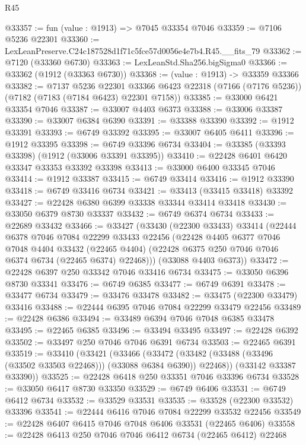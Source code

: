 \begin{lexlean}{R45}
\begin{coremodule}
{@33357 := fun (value : @1913) => @7045 @33354 @7046
@33359 := @7106 @5236 @22301
@33360 := LexLeanPreserve.C24c187528d1f71c5fce57d0056e4e7b4.R45.__fits_79
@33362 := @7120 (@33360 @6730)
@33363 := LexLeanStd.Sha256.bigSigma0
@33366 := @33362 (@1912 (@33363 @6730))
@33368 := (value : @1913) -> @33359 @33366
@33382 := @7137
    @5236
    @22301
    @33366
    @6423
    @22318
    (@7166 (@7176 @5236))
    (@7182 (@7183 (@7184 @6423) @22301 @7158))
@33385 := @33000 @6421 @33354 @7046
@33387 := @33007 @4403 @6373
@33388 := @33006 @33387
@33390 := @33007 @6384 @6390
@33391 := @33388 @33390
@33392 := @1912 @33391
@33393 := @6749 @33392
@33395 := @33007 @6405 @6411
@33396 := @1912 @33395
@33398 := @6749 @33396 @6734
@33404 := @33385 (@33393 @33398) (@1912 (@33006 @33391 @33395))
@33410 := @22428 @6401 @6420 @33347 @33353 @33392 @33398
@33413 := @33000 @6400 @33345 @7046
@33414 := @1912 @33387
@33415 := @6749 @33414
@33416 := @1912 @33390
@33418 := @6749 @33416 @6734
@33421 := @33413 (@33415 @33418) @33392
@33427 := @22428 @6380 @6399 @33338 @33344 @33414 @33418
@33430 := @33050 @6379 @8730 @33337
@33432 := @6749 @6374 @6734
@33433 := @22689 @33432
@33466 := @33427
    (@33430
      (@22300 @33433)
      @33414
      (@22444
        @6378
        @7046
        @7084
        @22299
        @33433
        @22456
        (@22428
          @4405
          @6377
          @7046
          @7048
          @4404
          @33432
          (@22465 @4404)
          (@22428 @6375 @250 @7046 @7046 @6374 @6734 (@22465 @6374) @22468)))
      (@33088 @4403 @6373))
@33472 := @22428 @6397 @250 @33342 @7046 @33416 @6734
@33475 := @33050 @6396 @8730 @33341
@33476 := @6749 @6385
@33477 := @6749 @6391
@33478 := @33477 @6734
@33479 := @33476 @33478
@33482 := @33475 (@22300 @33479) @33416
@33488 := @22444 @6395 @7046 @7084 @22299 @33479 @22456
@33489 := @22428 @6386
@33494 := @33489 @6394 @7046 @7048 @6385 @33478
@33495 := @22465 @6385
@33496 := @33494 @33495
@33497 := @22428 @6392
@33502 := @33497 @250 @7046 @7046 @6391 @6734
@33503 := @22465 @6391
@33519 := @33410
    (@33421
      (@33466
        (@33472 (@33482 (@33488 (@33496 (@33502 @33503 @22468))) (@33088 @6384 @6390)) @22468))
      (@33142 @33387 @33390))
@33525 := @22428 @6418 @250 @33351 @7046 @33396 @6734
@33528 := @33050 @6417 @8730 @33350
@33529 := @6749 @6406
@33531 := @6749 @6412 @6734
@33532 := @33529 @33531
@33535 := @33528 (@22300 @33532) @33396
@33541 := @22444 @6416 @7046 @7084 @22299 @33532 @22456
@33549 := @22428 @6407 @6415 @7046 @7048 @6406 @33531 (@22465 @6406)
@33558 := @22428 @6413 @250 @7046 @7046 @6412 @6734 (@22465 @6412) @22468
}
\end{coremodule}
\end{lexlean}
